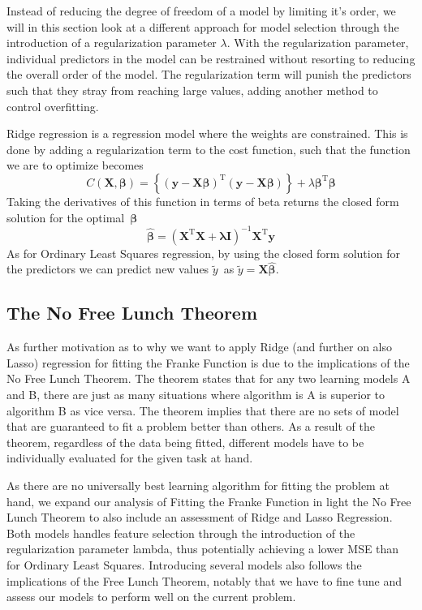 \documentclass[11pt, a4paper]{article}
\begin{document}
Instead of reducing the degree of freedom of a model by limiting it's order, we will in this section look at a different approach for model selection through the introduction of a regularization parameter $\lambda$. With the regularization parameter, individual predictors in the model can be restrained without resorting to reducing the overall order of the model. The regularization term will punish the predictors such that they stray from reaching large values, adding another method to control overfitting. \cite{Bishop2016}

Ridge regression is a regression model where the weights are constrained. \cite{Geron2019} This is done by adding a regularization term to the cost function, such that the function we are to optimize becomes
\[
  C\left(\bm{X},\bm{\beta}\right) = \left\{\left(\bm{y}-\bm{X}\bm{\beta}\right)^\text{T}\left(\bm{y}-\bm{X}\bm{\beta}\right)\right\}+\lambda\bm{\beta}^\text{T}\bm{\beta}
\]
Taking the derivatives of this function in terms of beta returns the closed form solution for the optimal $\bm{\beta}$
\[
  \bm{\hat{\beta}} = \left(\bm{X}^\text{T}\bm{X} + \bm{\lambda}\bm{I}\right)^{-1}\bm{X}^\text{T}\bm{y}
\]
As for Ordinary Least Squares regression, by using the closed form solution for the predictors we can predict new values $\tilde{y}$ as $\tilde{y} = \bm{X}\bm{\hat{\beta}}$.

\subsection*{The No Free Lunch Theorem}
As further motivation as to why we want to apply Ridge (and further on also Lasso) regression for fitting the Franke Function is due to the implications of the No Free Lunch Theorem. The theorem states that for any two learning models A and B, there are just as many situations where algorithm is A is superior to algorithm B as vice versa. \cite{Wolpert1996} The theorem implies that there are no sets of model that are guaranteed to fit a problem better than others. As a result of the theorem, regardless of the data being fitted, different models have to be individually evaluated for the given task at hand.

As there are no universally best learning algorithm for fitting the problem at hand, we expand our analysis of Fitting the Franke Function in light the No Free Lunch Theorem to also include an assessment of Ridge and Lasso Regression. Both models handles feature selection through the introduction of the regularization parameter lambda, thus potentially achieving a lower MSE than for Ordinary Least Squares. Introducing several models also follows the implications of the Free Lunch Theorem, notably that we have to fine tune and assess our models to perform well on the current problem. \cite{Goodfellow2016}
\end{document}

